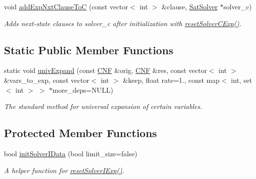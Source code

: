 \begin{DoxyCompactItemize}
void \hyperlink{classOrigUnivExpander_a6ebdb1dd5210ad13ee8cdb2adfe1ec48}{add\-Exp\-Nxt\-Clause\-To\-C} (const vector$<$ int $>$ \&clause, \hyperlink{classSatSolver}{Sat\-Solver} $\ast$solver\-\_\-c)
\begin{DoxyCompactList}\small\item\em Adds next-\/state clauses to solver\-\_\-c after initialization with \hyperlink{classOrigUnivExpander_a0752883a0f7a9bb17d5eda38a7dda2a1}{reset\-Solver\-C\-Exp()}. \end{DoxyCompactList}\end{DoxyCompactItemize}
\subsection*{Static Public Member Functions}
\begin{DoxyCompactItemize}
\item 
static void \hyperlink{classOrigUnivExpander_a5e28c3075de86dcc7228fa547b284590}{univ\-Expand} (const \hyperlink{classCNF}{C\-N\-F} \&orig, \hyperlink{classCNF}{C\-N\-F} \&res, const vector$<$ int $>$ \&vars\-\_\-to\-\_\-exp, const vector$<$ int $>$ \&keep, float rate=1., const map$<$ int, set$<$ int $>$ $>$ $\ast$more\-\_\-deps=N\-U\-L\-L)
\begin{DoxyCompactList}\small\item\em The standard method for universal expansion of certain variables. \end{DoxyCompactList}\end{DoxyCompactItemize}
\subsection*{Protected Member Functions}
\begin{DoxyCompactItemize}
\item 
bool \hyperlink{classOrigUnivExpander_a1ca430c08a9927733951149db492916e}{init\-Solver\-I\-Data} (bool limit\-\_\-size=false)
\begin{DoxyCompactList}\small\item\em A helper function for \hyperlink{classOrigUnivExpander_abcd12e41626b01f53ac7b8c654fa9218}{reset\-Solver\-I\-Exp()}. \end{DoxyCompactList}\end{DoxyCompactItemize}
